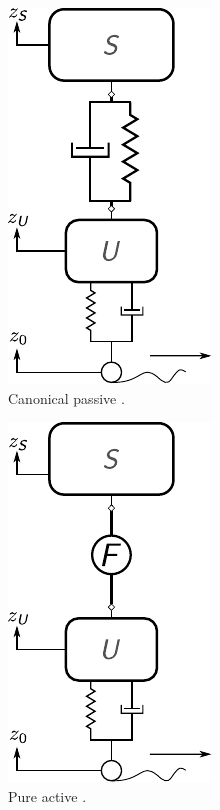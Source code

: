 \begin{figure}
\centering

\begin{subfigure}[t]{0.33\textwidth}
\centering
\includegraphics[scale=0.8]{../ch8/figures/csuspension1}
\caption{Canonical passive \cite{Allison2008b, Gobbi2001a}.\label{fig:ch8:csuspension1}}
\end{subfigure}%
\begin{subfigure}[t]{0.33\textwidth}
\centering
\includegraphics[scale=0.8]{../ch8/figures/csuspension2}
\caption{Pure active \cite{Hrovat1993a, Hrovat1997a}.\label{fig:ch8:csuspension2}}
\end{subfigure}%
\begin{subfigure}[t]{0.33\textwidth}
\centering

\end{subfigure}
\end{figure}
